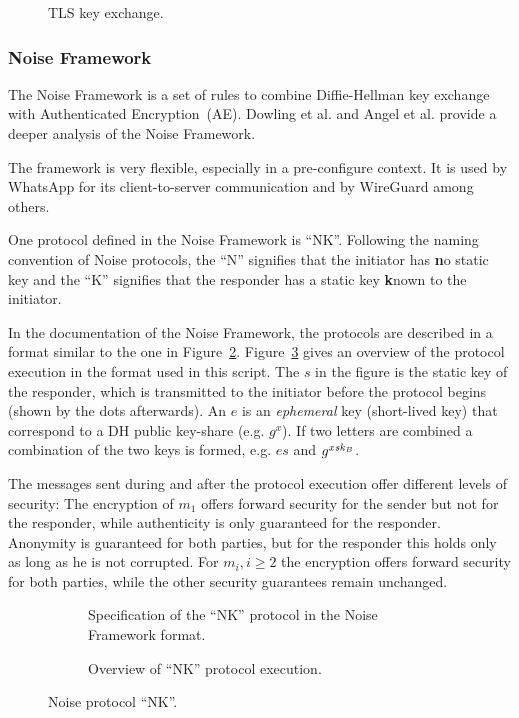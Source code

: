 \begin{figure}[!ht]
    \centering
    
    \caption{TLS key exchange.}
    \label{fig:ake:tls}
\end{figure}

\subsubsection{Noise Framework}
The Noise Framework \cite{NoiseFramework} is a set of rules to combine Diffie-Hellman key exchange with Authenticated Encryption~(AE). Dowling et al. \cite{PKC:DowRosSch20} and Angel et al. \cite{CCS:ADHSW22} provide a deeper analysis of the Noise Framework.

The framework is very flexible, especially in a pre-configure context.
It is used by WhatsApp for its client-to-server communication and by WireGuard among others.

One protocol defined in the Noise Framework is ``NK''. 
Following the naming convention of Noise protocols, the ``N'' signifies that the initiator has \textbf{n}o static key and the ``K'' signifies that the responder has a static key \textbf{k}nown to the initiator.

In the documentation of the Noise Framework, the protocols are described in a format similar to the one in Figure~\ref{fig:ake:noise:nk}.
Figure~\ref{fig:ake:noise:nk_overview} gives an overview of the protocol execution in the format used in this script.
The $s$ in the figure is the static key of the responder, which is transmitted to the initiator before the protocol begins (shown by the dots afterwards).
An $e$ is an \emph{ephemeral} key (short-lived key) that correspond to a DH public key-share (e.g. $g^x$).
If two letters are combined a combination of the two keys is formed, e.g. $es$ and $g^{x\mathit{sk}_B}$.

The messages sent during and after the protocol execution offer different levels of security: 
The encryption of $m_1$ offers forward security for the sender but not for the responder, while authenticity is only guaranteed for the responder.
Anonymity is guaranteed for both parties, but for the responder this holds only as long as he is not corrupted.
For $m_i, i\geq 2$ the encryption offers forward security for both parties, while the other security guarantees remain unchanged.

\begin{figure}[!ht]
    \centering
    \begin{subfigure}{.33\textwidth}
        \centering
        
        \caption{Specification of the ``NK'' protocol in the Noise Framework format.}
        \label{fig:ake:noise:nk}
    \end{subfigure}\hfill
    \begin{subfigure}{.66\textwidth}
        \centering
        
        \caption{Overview of ``NK'' protocol execution.}
        \label{fig:ake:noise:nk_overview}
    \end{subfigure}
    \caption{Noise protocol ``NK''.}
    \label{fig:ake:noise}
\end{figure}

